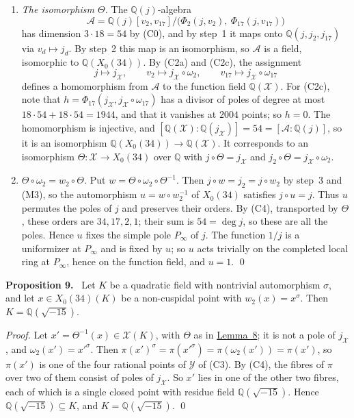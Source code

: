 \documentclass[11pt]{article}
\newenvironment{statement}[1]{\par\medskip\noindent\phantomsection\textbf{#1}\ }{\par\medskip}
\newcommand{\Q}{\mathbb Q}
\begin{document}
\begin{enumerate}
\item \emph{The isomorphism \(\Theta\).} The \(\Q(j)\)-algebra
\[\mathcal A=\Q(j)[v_2,v_{17}]/\bigl(\Phi_2(j,v_2),\ \Phi_{17}(j,v_{17})\bigr)\]
has dimension \(3\cdot18=54\) by (C0), and by step~1 it maps onto \(\Q(j,j_2,j_{17})\) via
\(v_d\mapsto j_d\). By step~2 this map is an isomorphism, so \(\mathcal A\) is a field,
isomorphic to \(\Q(X_0(34))\). By (C2a) and (C2c), the assignment
\[j\mapsto j_{\mathcal X},\qquad v_2\mapsto j_{\mathcal X}\circ\omega_2,\qquad
v_{17}\mapsto j_{\mathcal X}\circ\omega_{17}\]
defines a homomorphism from \(\mathcal A\) to the function field \(\Q(\mathcal X)\). For (C2c),
note that \(h=\Phi_{17}(j_{\mathcal X},j_{\mathcal X}\circ\omega_{17})\) has a divisor of poles
of degree at most \(18\cdot54+18\cdot54=1944\), and that it vanishes at \(2004\) points; so
\(h=0\). The homomorphism is injective, and
\([\Q(\mathcal X):\Q(j_{\mathcal X})]=54=[\mathcal A:\Q(j)]\), so it is an isomorphism
\(\Q(X_0(34))\to\Q(\mathcal X)\). It corresponds to an isomorphism
\(\Theta:\mathcal X\to X_0(34)\) over \(\Q\) with \(j\circ\Theta=j_{\mathcal X}\) and
\(j_2\circ\Theta=j_{\mathcal X}\circ\omega_2\).

\item \emph{\(\Theta\circ\omega_2=w_2\circ\Theta\).} Put
\(w=\Theta\circ\omega_2\circ\Theta^{-1}\). Then \(j\circ w=j_2=j\circ w_2\) by step~3 and (M3),
so the automorphism \(u=w\circ w_2^{-1}\) of \(X_0(34)\) satisfies \(j\circ u=j\). Thus \(u\)
permutes the poles of \(j\) and preserves their orders. By (C4), transported by \(\Theta\),
these orders are \(34,17,2,1\); their sum is \(54=\deg j\), so these are all the poles. Hence
\(u\) fixes the simple pole \(P_\infty\) of \(j\). The function \(1/j\) is a uniformizer at
\(P_\infty\) and is fixed by \(u\); so \(u\) acts trivially on the completed local ring at
\(P_\infty\), hence on the function field, and \(u=1\). \qed
\end{enumerate}

\begin{statement}{Proposition 9.}\label{prop-x034}
Let \(K\) be a quadratic field with nontrivial automorphism \(\sigma\), and let
\(x\in X_0(34)(K)\) be a non-cuspidal point with \(w_2(x)=x^\sigma\). Then
\(K=\Q(\sqrt{-15})\).
\end{statement}

\emph{Proof.} Let \(x'=\Theta^{-1}(x)\in\mathcal X(K)\), with \(\Theta\) as in
\hyperref[lemma-model]{Lemma~8}; it is not a pole of \(j_{\mathcal X}\), and
\(\omega_2(x')=x'^\sigma\). Then
\(\pi(x')^\sigma=\pi(x'^\sigma)=\pi(\omega_2(x'))=\pi(x')\), so \(\pi(x')\) is one of the four
rational points of \(\mathcal Y\) of (C3). By (C4), the fibres of \(\pi\) over two of them
consist of poles of \(j_{\mathcal X}\). So \(x'\) lies in one of the other two fibres, each of
which is a single closed point with residue field \(\Q(\sqrt{-15})\). Hence
\(\Q(\sqrt{-15})\subseteq K\), and \(K=\Q(\sqrt{-15})\). \qed
\end{document}
